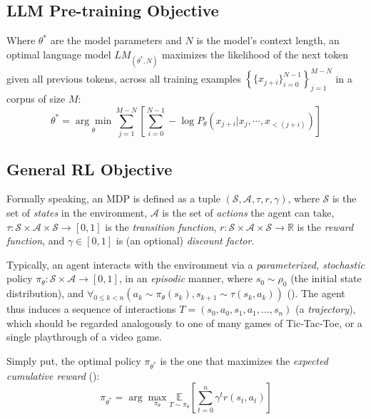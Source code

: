 \documentclass{article} %
\theoremstyle{definition}
\begin{document}
\subsection{LLM Pre-training Objective}

Where $\theta^{*}$ are the model parameters and $N$ is the model's context length, 
an optimal language model $LM_{(\theta^{*}, N)}$
maximizes the likelihood of the next token given all previous tokens, across all training examples
$\left\{\{x_{j + i}\}_{i = 0}^{N - 1}\right\}_{j = 1}^{M - N}$ 
in a corpus of size $M$:
\begin{equation} \label{eq:pretrain-obj}
    \theta^{*} = \underset{\theta}{\arg\min} \sum_{j = 1}^{M - N} \left[\sum_{i = 0}^{N - 1} -\log P_{\theta}(x_{j + i} | x_j, \cdots, x_{< (j + i)})\right]
\end{equation}

\subsection{General RL Objective}
\label{sec:rl-obj}

Formally speaking, an MDP is defined as a tuple $(\mathcal{S}, \mathcal{A}, \tau, r, \gamma)$, 
where $\mathcal{S}$ is the set of \textit{states} in the environment, 
$\mathcal{A}$ is the set of \textit{actions} the agent can take,
$\tau: \mathcal{S} \times \mathcal{A} \times \mathcal{S} \rightarrow [0, 1]$ is the \textit{transition function},
$r: \mathcal{S} \times \mathcal{A} \times \mathcal{S} \rightarrow \mathbb{R}$ is the \textit{reward function}, and 
$\gamma \in [0, 1]$ is (an optional) \textit{discount factor}.


Typically, an agent interacts with the environment 
via a \textit{parameterized, stochastic} policy $\pi_\theta: \mathcal{S} \times \mathcal{A} \rightarrow [0, 1]$,
in an \textit{episodic} manner, where $s_0 \sim \rho_0$ (the initial state distribution),
and $\forall_{0 \leq k < n}\left(a_{k} \sim \pi_\theta(s_k), s_{k+1} \sim \tau(s_k, a_{k})\right)$ (\cite{wk1}). 
The agent thus induces a sequence of interactions $T = (s_0, a_0, s_1, a_1, \ldots, s_n)$
(a \textit{trajectory}), which should be regarded analogously to one
of many games of Tic-Tac-Toe, or a single playthrough of a video game.

Simply put, the optimal policy $\pi_{\theta^{*}}$ is the one that maximizes the \textit{expected cumulative reward} (\cite{wk2}):
\begin{equation} \label{eq:rl-obj}
    \pi_{\theta^{*}} = {\displaystyle \arg\max_{\pi_\theta} \underset{T \sim \pi_{\theta}}{\mathbb{E}} \left[ \sum_{t=0}^{n} \gamma^t r(s_t, a_t) \right] }
\end{equation}
\end{document}
